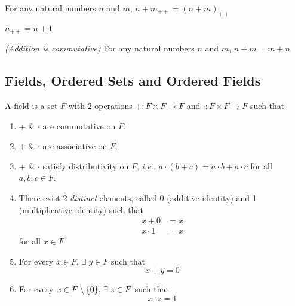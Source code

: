 \documentclass[12pt]{article}
\begin{document}
\begin{lem} \label{lem:n+succ(m)=succ(n+m)}
For any natural numbers $n$ and $m$, $n+m_{++}=(n+m)_{++}$
\end{lem}

\begin{cor} \label{cor:succ(n)=n+1}
    $n_{++} = n + 1$
\end{cor}

\begin{prop} \label{prop:addn is commutative}
\emph{(Addition is commutative)} For any natural numbers $n$ and $m$, $n + m = m + n$
\end{prop}

\subsection{Fields, Ordered Sets and Ordered Fields}

\begin{defn} \label{defn:field}
    A field is a set $F$ with 2 operations $+ : F \times F \to F$ and $\cdot : F \times F \to F$ such that
    \begin{enumerate}[label=(F\arabic*)]
        \item \label{field:comm}
            $+$ \& $\cdot$ are commutative on $F$.
        \item \label{field:asso}
            $+$ \& $\cdot$ are associative on $F$.
        \item \label{field:dist}
            $+$ \& $\cdot$ satisfy distributivity on $F$, \textit{i.e.}, $a \cdot (b + c) = a \cdot b + a \cdot c$ for all $a, b, c \in F$. 
        \item \label{field:iden}
            There exist 2 \emph{distinct} elements, called 0 (additive identity) and 1 (multiplicative identity) such that
            \begin{align*}
                x + 0 &= x \\
                x \cdot 1 &= x
            \end{align*}
            for all $x \in F$
        \item \label{field:negative}
            For every $x \in F, \,\exists\; y \in F$ such that \[
                x + y = 0
            \]
        \item \label{field:reciprocal}
            For every $x \in F \setminus \set{0}, \,\exists\; z \in F$ such that \[
                x \cdot z = 1
            \]
    \end{enumerate}
\end{defn}
\end{document}
